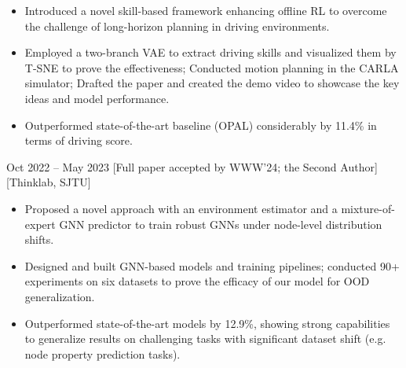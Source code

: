 \documentclass{chicv}
\begin{document}
\begin{itemize}
	\item Introduced a novel skill-based framework enhancing offline RL to overcome the challenge of long-horizon planning in driving environments.
	\item Employed a two-branch VAE to extract driving skills and visualized them by T-SNE to prove the effectiveness; Conducted motion planning in the CARLA simulator; Drafted the paper and created the demo video to showcase the key ideas and model performance.
	\item Outperformed state-of-the-art baseline (OPAL) considerably by 11.4\% in terms of driving score.
\end{itemize}

{Oct 2022 -- May 2023}
[Full paper accepted by WWW'24; the Second Author]
[Thinklab, SJTU]

\begin{itemize}
	\item Proposed a novel approach with an environment estimator and a mixture-of-expert GNN predictor to train robust GNNs under node-level distribution shifts.
	\item Designed and built GNN-based models and training pipelines; conducted 90+ experiments on six datasets to prove the efficacy of our model for OOD generalization.
	\item Outperformed state-of-the-art models by 12.9\%, showing strong capabilities to generalize results on challenging tasks with significant dataset shift (e.g. node property prediction tasks).
\end{itemize}



\end{document}
